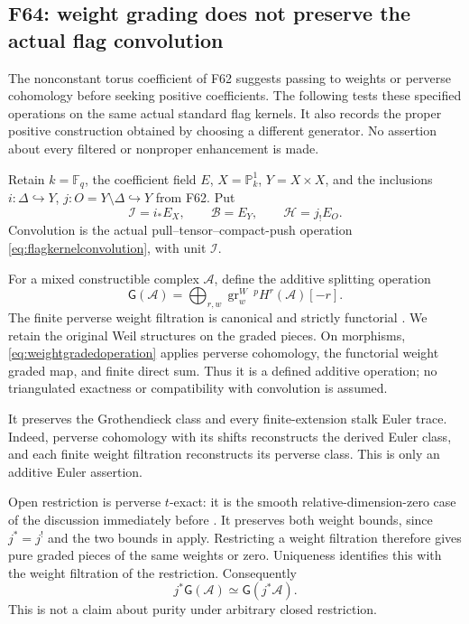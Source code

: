 \documentclass[11pt,a4paper]{article}
\newcommand{\fid}[1]{\textsf{#1}}\newcommand{\gate}[1]{\textsf{#1}}
\theoremstyle{named}\newtheorem{finding}{Finding}[section]
\theoremstyle{definition}\newtheorem{definition}[finding]{Definition}
\theoremstyle{remark}\newtheorem{remark}[finding]{Remark}
\begin{document}
\subsection{\fid{F64}: weight grading does not preserve the actual flag convolution}
\label{sec:weightextraction}

The nonconstant torus coefficient of \fid{F62} suggests passing
to weights or perverse cohomology before seeking positive
coefficients. The following tests these specified operations on
the same actual standard flag kernels. It also records the
proper positive construction obtained by choosing a different
generator. No assertion about every filtered or nonproper
enhancement is made.

Retain \(k=\mathbb F_q\), the coefficient field \(E\),
\(X=\mathbb P^1_k\), \(Y=X\times X\), and the inclusions
\(i:\Delta\hookrightarrow Y\), \(j:O=Y\setminus\Delta
\hookrightarrow Y\) from \fid{F62}. Put
\[
 \mathcal I=i_*E_X,\qquad
 \mathcal B=E_Y,\qquad
 \mathcal H=j_!E_O.
\]
Convolution is the actual pull--tensor--compact-push operation
\eqref{eq:flagkernelconvolution}, with unit \(\mathcal I\).

For a mixed constructible complex \(\mathcal A\), define
the additive splitting operation
\begin{equation}\label{eq:weightgradedoperation}
 \mathsf G(\mathcal A)=
 \bigoplus_{r,w}
       \operatorname{gr}^W_w\,{}^pH^r(\mathcal A)[-r].
\end{equation}
The finite perverse weight filtration is canonical and strictly
functorial \cite[Theorem~5.3.5 and its proof through
Lemma~5.3.6, pp.~136--137]{BBD}. We retain the original Weil
structures on the graded pieces. On morphisms,
\eqref{eq:weightgradedoperation} applies perverse cohomology,
the functorial weight graded map, and finite direct sum.
Thus it is a defined additive operation; no triangulated
exactness or compatibility with convolution is assumed.

It preserves the Grothendieck class and every finite-extension
stalk Euler trace. Indeed, perverse cohomology with its shifts
reconstructs the derived Euler class, and each finite weight
filtration reconstructs its perverse class. This is only an
additive Euler assertion.

Open restriction is perverse \(t\)-exact: it is the smooth
relative-dimension-zero case of the discussion immediately
before \cite[Proposition~4.2.5, pp.~108--109]{BBD}.
It preserves both weight bounds, since \(j^*=j^!\) and the two
bounds in \cite[5.1.14, p.~128]{BBD} apply. Restricting a
weight filtration therefore gives pure graded pieces of the
same weights or zero. Uniqueness identifies this with the
weight filtration of the restriction. Consequently
\begin{equation}\label{eq:weightgradedopenrestriction}
             j^*\mathsf G(\mathcal A)
                  \simeq\mathsf G(j^*\mathcal A).
\end{equation}
This is not a claim about purity under arbitrary closed
restriction.
\end{document}
